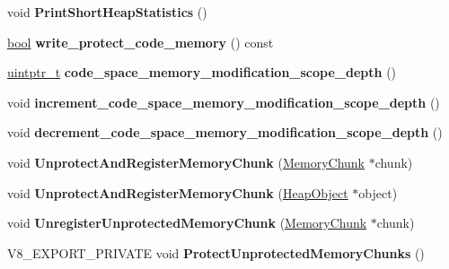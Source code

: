 \begin{DoxyCompactItemize}
void {\bfseries Print\+Short\+Heap\+Statistics} ()
\item 
\mbox{\label{classv8_1_1internal_1_1Heap_aee2b3c02a647ebeaf206a9344faeaa06}} 
\mbox{\hyperlink{classbool}{bool}} {\bfseries write\+\_\+protect\+\_\+code\+\_\+memory} () const
\item 
\mbox{\label{classv8_1_1internal_1_1Heap_a8dee45442f416a0fac10ffe16186c92f}} 
\mbox{\hyperlink{classuintptr__t}{uintptr\+\_\+t}} {\bfseries code\+\_\+space\+\_\+memory\+\_\+modification\+\_\+scope\+\_\+depth} ()
\item 
\mbox{\label{classv8_1_1internal_1_1Heap_af38fdeb2898bd11f7f2e4ea50afd4bc9}} 
void {\bfseries increment\+\_\+code\+\_\+space\+\_\+memory\+\_\+modification\+\_\+scope\+\_\+depth} ()
\item 
\mbox{\label{classv8_1_1internal_1_1Heap_aa7e5131326b9ab076e3f7b9b9b1ad294}} 
void {\bfseries decrement\+\_\+code\+\_\+space\+\_\+memory\+\_\+modification\+\_\+scope\+\_\+depth} ()
\item 
\mbox{\label{classv8_1_1internal_1_1Heap_aa6bdcfebcf2bf47c5fe6aa37b970567d}} 
void {\bfseries Unprotect\+And\+Register\+Memory\+Chunk} (\mbox{\hyperlink{classv8_1_1internal_1_1MemoryChunk}{Memory\+Chunk}} $\ast$chunk)
\item 
\mbox{\label{classv8_1_1internal_1_1Heap_a7d69ef6756fa4c8f6ff4f43a789c4a89}} 
void {\bfseries Unprotect\+And\+Register\+Memory\+Chunk} (\mbox{\hyperlink{classv8_1_1internal_1_1HeapObject}{Heap\+Object}} $\ast$object)
\item 
\mbox{\label{classv8_1_1internal_1_1Heap_a064997d2062c2538ac80b87824c07207}} 
void {\bfseries Unregister\+Unprotected\+Memory\+Chunk} (\mbox{\hyperlink{classv8_1_1internal_1_1MemoryChunk}{Memory\+Chunk}} $\ast$chunk)
\item 
\mbox{\label{classv8_1_1internal_1_1Heap_a750845ee50becc35c9bea639ec73d915}} 
V8\+\_\+\+E\+X\+P\+O\+R\+T\+\_\+\+P\+R\+I\+V\+A\+TE void {\bfseries Protect\+Unprotected\+Memory\+Chunks} ()

\end{DoxyCompactItemize}

